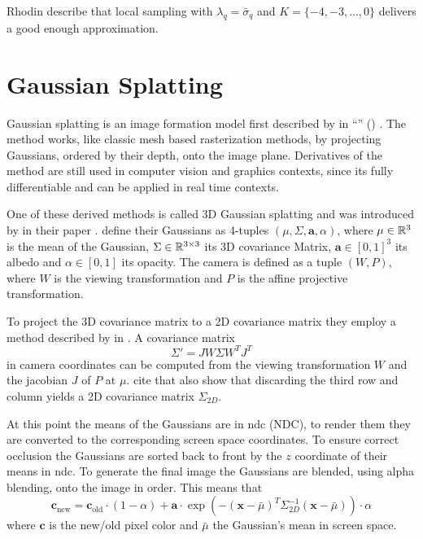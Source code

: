 \documentclass[a4paper, 11pt]{memoir}
\begin{document}
    Rhodin \etal describe that local sampling with $\lambda_q = \bar{\sigma}_q$ and $K = \{ -4, -3, \dots, 0 \}$
    delivers a good enough approximation.

    \section{Gaussian Splatting}
    \label{sec:splatting}
    Gaussian splatting is an image formation model first described by \citeauthor{splatting} in \enquote{}
    (\citeyear{splatting}) \cite{splatting}. The method works, like classic mesh based rasterization methods, by projecting
    Gaussians, ordered by their depth, onto the image plane. Derivatives of the method are still used in computer vision
    and graphics contexts, since its fully differentiable and can be applied in real time contexts.

    One of these derived methods is called 3D Gaussian splatting and was introduced by \citeauthor{kerbl3Dgaussians} in
    their \citeyear{kerbl3Dgaussians} paper \cite{kerbl3Dgaussians}. \citeauthor{splatting}
    define their Gaussians as 4-tuples $(\mu, \Sigma, \mathbf{a}, \alpha)$, where $\mu \in \mathbb{R}^3$ is the mean of the
    Gaussian, $\Sigma \in \mathbb{R}^{3\times 3}$ its 3D covariance Matrix, $\mathbf{a} \in [0, 1]^3$ its albedo and
    $\alpha \in [0, 1]$ its opacity. The camera is defined as a tuple $(W, P)$, where $W$ is the viewing transformation
    and $P$ is the affine projective transformation.

    To project the 3D covariance matrix to a 2D covariance matrix they employ a method described by \citeauthor{volume_splatting}
    in \cite{volume_splatting}. A covariance matrix
    \begin{equation}
        \Sigma' = JW\Sigma W^TJ^T
    \end{equation}
    in camera coordinates can be computed from the viewing transformation $W$ and the jacobian $J$ of $P$ at $\mu$.
    \citeauthor{kerbl3Dgaussians} cite that \citeauthor{volume_splatting} also show that discarding the third row and
    column yields a 2D covariance matrix $\Sigma_{2D}$.

    At this point the means of the Gaussians are in \gls{ndc} (NDC), to render them they are converted to the corresponding
    screen space coordinates. To ensure correct occlusion the Gaussians are sorted back to front by the $z$ coordinate of
    their means in \gls{ndc}. To generate the final image the Gaussians are blended, using alpha blending, onto the image
    in order. This means that
    \begin{equation}
        \mathbf{c}_{\text{new}} = \mathbf{c}_{\text{old}} \cdot (1 - \alpha) + \mathbf{a} \cdot \exp{\left(-(\mathbf{x} - \bar{\mu})^T\Sigma_{2D}^{-1}(\mathbf{x} - \bar{\mu})\right)} \cdot \alpha
    \end{equation}
    where $\mathbf{c}$ is the new/old pixel color and $\bar{\mu}$ the Gaussian's mean in screen space.
\end{document}
